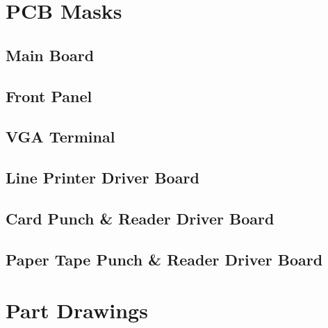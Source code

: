 \documentclass{book}
\begin{document}
\chapter{PCB Masks}
\section{Main Board}
\cleardoublepage
\section{Front Panel}
\cleardoublepage
\section{VGA Terminal}
\cleardoublepage
\section{Line Printer Driver Board}
\cleardoublepage
\section{Card Punch \& Reader Driver Board}
\cleardoublepage
\section{Paper Tape Punch \& Reader Driver Board}
\chapter{Part Drawings}
\backmatter


\end{document}
